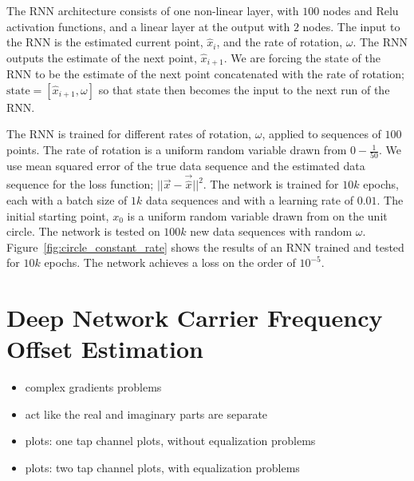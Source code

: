 The RNN architecture consists of one non-linear layer, with $100$ nodes and Relu activation functions, and a linear layer at the output with $2$ nodes. The input to the RNN is the estimated current point, $\hat{x}_i$, and the rate of rotation, $\omega$.  The RNN outputs the estimate of the next point, $\hat{x}_{i+1}$.  We are forcing the state of the RNN to be the estimate of the next point concatenated with the rate of rotation; $\text{state} = [\hat{x}_{i+1},\omega]$ so that state then becomes the input to the next run of the RNN.

The RNN is trained for different rates of rotation, $\omega$, applied to sequences of $100$ points.
The rate of rotation is a uniform random variable drawn from $0-\frac{1}{50}$.
We use mean squared error of the true data sequence and the estimated data sequence for the loss function; $||\vec{x}-\vec{\hat{x}}||^2$.  The network is trained for $10k$ epochs, each with a batch size of $1k$ data sequences and with a learning rate of $0.01$.  The initial starting point, $x_0$ is a uniform random variable drawn from on the unit circle.
The network is tested on $100k$ new data sequences with random $\omega$.
Figure~\ref{fig:circle_constant_rate} shows the results of an RNN trained and tested for $10k$ epochs.  The network achieves a loss on the order of $10^{-5}$.


\section{Deep Network Carrier Frequency Offset Estimation}
\begin{itemize}
\item complex gradients problems
\item act like the real and imaginary parts are separate
\item plots: one tap channel plots, without equalization problems
\item plots: two tap channel plots, with equalization problems
\end{itemize}


